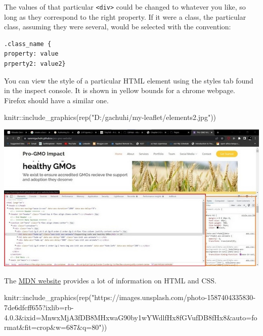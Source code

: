 \documentclass[
]{book}
\newenvironment{Shaded}{\begin{snugshade}}{\end{snugshade}}
\newcommand{\FunctionTok}[1]{\textcolor[rgb]{0.00,0.00,0.00}{#1}}
\newcommand{\NormalTok}[1]{#1}
\newcommand{\SpecialCharTok}[1]{\textcolor[rgb]{0.00,0.00,0.00}{#1}}
\newcommand{\StringTok}[1]{\textcolor[rgb]{0.31,0.60,0.02}{#1}}
\theoremstyle{definition}
\theoremstyle{definition}
\theoremstyle{definition}
\theoremstyle{definition}
\theoremstyle{remark}
\begin{document}
The values of that particular \texttt{\textless{}div\textgreater{}} could be changed to whatever you like, so long as they correspond to the right property. If it were a class, the particular class, assuming they were several, would be selected with the convention:

\begin{verbatim}
.class_name {
property: value
prperty2: value2}
\end{verbatim}

You can view the style of a particular HTML element using the styles tab found in the inspect console. It is shown in yellow bounds for a chrome webpage. Firefox should have a similar one.

\begin{Shaded}
\begin{Highlighting}[]
\NormalTok{knitr}\SpecialCharTok{::}\FunctionTok{include\_graphics}\NormalTok{(}\FunctionTok{rep}\NormalTok{(}\StringTok{"D:/gachuhi/my{-}leaflet/elements2.jpg"}\NormalTok{))}
\end{Highlighting}
\end{Shaded}

\includegraphics[width=11.11in]{../elements2}

The \href{https://developer.mozilla.org/en-US/docs/Learn/CSS/First_steps/How_CSS_is_structured}{MDN website} provides a lot of information on HTML and CSS.

\begin{Shaded}
\begin{Highlighting}[]
\NormalTok{knitr}\SpecialCharTok{::}\FunctionTok{include\_graphics}\NormalTok{(}\FunctionTok{rep}\NormalTok{(}\StringTok{"https://images.unsplash.com/photo{-}1587404335830{-}7de6dfcff655?ixlib=rb{-}4.0.3\&ixid=MnwxMjA3fDB8MHxwaG90by1wYWdlfHx8fGVufDB8fHx8\&auto=format\&fit=crop\&w=687\&q=80"}\NormalTok{))}
\end{Highlighting}
\end{Shaded}
\end{document}
